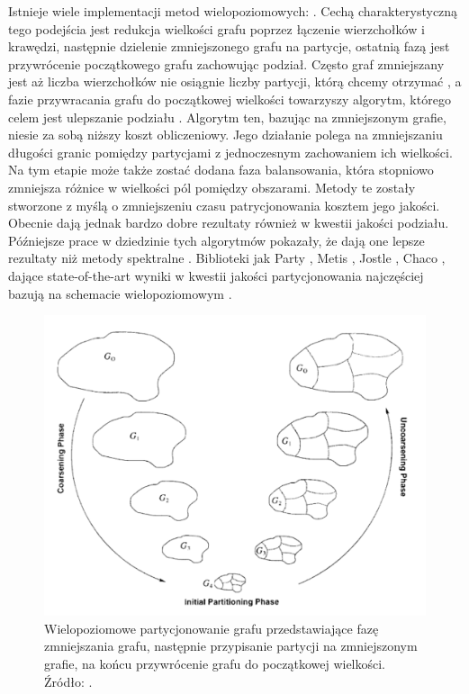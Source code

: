 Istnieje wiele implementacji metod wielopoziomowych: \cite{metis, jostle, Bui1993AHF, 103500, 185177, 279334, inproceedings, 129970, 10.1145/165939.165942}.
Cechą charakterystyczną tego podejścia jest redukcja
wielkości grafu poprzez łączenie wierzchołków i krawędzi, następnie dzielenie zmniejszonego grafu na partycje, ostatnią fazą
jest przywrócenie początkowego grafu zachowując podział.
Często graf zmniejszany jest aż liczba wierzchołków nie osiągnie
liczby partycji, którą chcemy otrzymać \cite{1364754}, a fazie przywracania grafu do początkowej wielkości towarzyszy
algorytm, którego celem jest ulepszanie podziału \cite{article, 10.5555/800263.809204}.
Algorytm ten, bazując na zmniejszonym
grafie, niesie za sobą niższy koszt obliczeniowy.
Jego działanie polega na zmniejszaniu długości granic pomiędzy partycjami z jednoczesnym zachowaniem ich wielkości.
Na tym etapie może także zostać dodana faza balansowania, która stopniowo zmniejsza różnice w wielkości pól pomiędzy
obszarami.
Metody te zostały stworzone z myślą o zmniejszeniu czasu patrycjonowania kosztem jego jakości.
Obecnie dają jednak bardzo dobre rezultaty również w kwestii jakości podziału.
Późniejsze prace w dziedzinie tych algorytmów pokazały, że dają one lepsze rezultaty niż metody spektralne \cite{metis}.
Biblioteki jak Party \cite{1364754}, Metis \cite{metis}, Jostle \cite{jostle}, Chaco \cite{inproceedings},
dające state-of-the-art wyniki w kwestii jakości partycjonowania najczęściej bazują na schemacie wielopoziomowym
\cite{inproceedings}.

\begin{figure}[h]
    \centering
    \includegraphics[width=0.9\linewidth]{images/coarsening}
    \caption{Wielopoziomowe partycjonowanie grafu przedstawiające fazę zmniejszania grafu, następnie przypisanie
    partycji na zmniejszonym grafie, na końcu przywrócenie grafu do początkowej wielkości.
    Źródło: \cite{KARYPIS199896}.}
    \label{im:multilevel_partitioning}
\end{figure}


